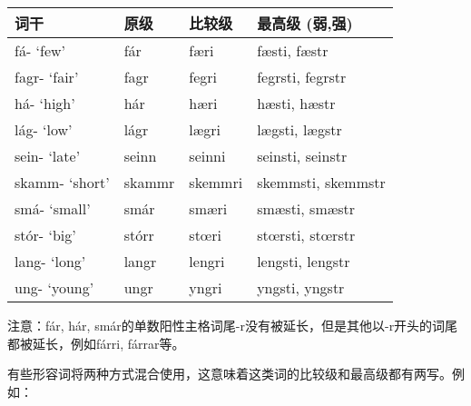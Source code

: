 \begin{longtable}{llll}
\toprule
词干 & 原级 & 比较级 & 最高级 (弱,强) \\
\midrule
\endhead
\bottomrule
\endfoot
fá- `few‌' & fár & færi & fæsti, fæstr \\
fagr- `fair‌' & fagr & fegri & fegrsti, fegrstr \\
há- `high‌' & hár & hæri & hæsti, hæstr \\
lág- `low‌' & lágr & lægri & lægsti, lægstr \\
sein- `late‌' & seinn & seinni & seinsti, seinstr \\
skamm- `short‌' & skammr & skemmri & skemmsti, skemmstr \\
smá- `small‌' & smár & smæri & smæsti, smæstr \\
stór- `big‌' & stórr & stœri & stœrsti, stœrstr \\
lang- `long‌' & langr & lengri & lengsti, lengstr \\
ung- `young‌' & ungr & yngri & yngsti, yngstr \\
\end{longtable}

注意：fár, hár,
smár的单数阳性主格词尾-r没有被延长，但是其他以-r开头的词尾都被延长，例如fárri,
fárrar等。

有些形容词将两种方式混合使用，这意味着这类词的比较级和最高级都有两写。例如：

